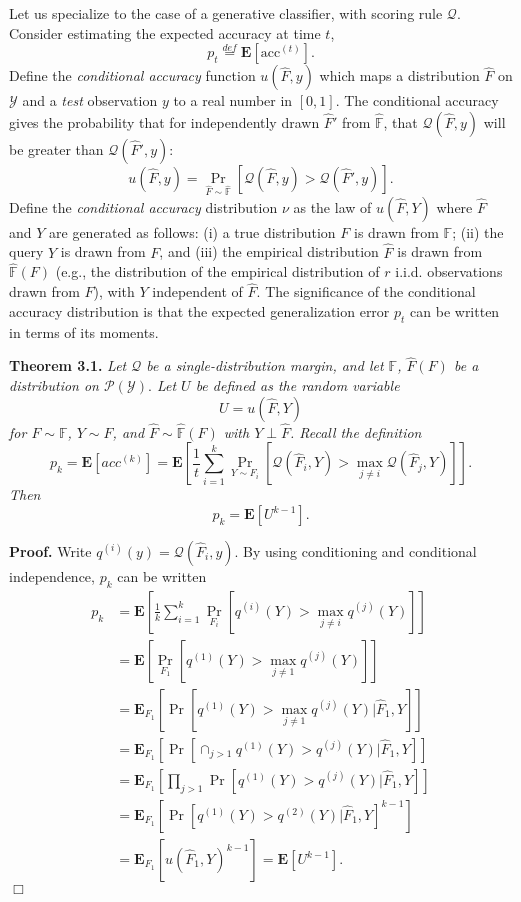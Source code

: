 \documentclass{article}
\newcommand{\E}{\textbf{E}}
\begin{document}
Let us specialize to the case of a generative classifier, with scoring rule $\mathcal{Q}$.
Consider estimating the expected accuracy at time $t$, \[p_t
\stackrel{def}{=} \E[\text{acc}^{(t)}].\]
Define the \emph{conditional accuracy} function $u(\hat{F}, y)$ which maps a
distribution $\hat{F}$ on $\mathcal{Y}$ and a \emph{test} observation $y$ to
a real number in $[0,1]$.  The conditional accuracy gives the
probability that for independently drawn $\hat{F}'$ from $\hat{\mathbb{F}}$, that
$\mathcal{Q}(\hat{F}, y)$ will be greater than $\mathcal{Q}(\hat{F}', y)$:
\[
u(\hat{F}, y) = \Pr_{\hat{F} \sim \hat{\mathbb{F}}}[\mathcal{Q}(\hat{F}, y) > \mathcal{Q}(\hat{F}', y)].
\]
Define the \emph{conditional accuracy} distribution $\nu$ as the law
of $u(\hat{F}, Y)$ where $\hat{F}$ and $Y$ are generated as follows:
(i) a true distribution $F$ is drawn from $\mathbb{F}$; (ii) the query $Y$ is drawn from $F$, 
and (iii) the empirical distribution $\hat{F}$ is drawn from $\hat{\mathbb{F}}(F)$ 
(e.g., the distribution of the empirical distribution of $r$ i.i.d. observations drawn from $F$),
with $Y$ independent of $\hat{F}$.  The significance of the conditional accuracy
distribution is that the expected generalization error $p_t$ can be
written in terms of its moments.

\noindent\textbf{Theorem 3.1.} \emph{
Let $\mathcal{Q}$ be a single-distribution margin, and let $\mathbb{F}$, $\hat{F}(F)$ be a distribution on $\mathcal{P}(\mathcal{Y}).$
Let $U$ be defined as the random variable
\[
U = u(\hat{F}, Y)
\]
for $F \sim \mathbb{F}$, $Y \sim F$, and $\hat{F} \sim \hat{\mathbb{F}}(F)$ with $Y \perp \hat{F}$.
Recall the definition
\[
p_k = \E[acc^{(k)}] = \E\left[\frac{1}{t}\sum_{i=1}^k \Pr_{Y \sim F_i}[\mathcal{Q}(\hat{F}_i, Y) > \max_{j \neq i}\mathcal{Q}(\hat{F}_j, Y)]\right].
\]
Then \[p_k = \E[U^{k-1}].\]
}

\noindent\textbf{Proof.}  
Write $q^{(i)}(y) = \mathcal{Q}(\hat{F}_i, y)$.
By using conditioning and
conditional independence, $p_k$ can be written
\begin{align*}
p_k &= \E\left[ \frac{1}{k}\sum_{i=1}^k  \Pr_{F_i}[q^{(i)}(Y) > \max_{j\neq i} q^{(j)}(Y)] \right]
\\&= \E\left[ \Pr_{F_1}[q^{(1)}(Y) > \max_{j\neq 1} q^{(j)}(Y)] \right]
\\&= \E_{F_1}[\Pr[q^{(1)}(Y) > \max_{j\neq 1} q^{(j)}(Y)|\hat{F}_1, Y]]
\\&= \E_{F_1}[\Pr[\cap_{j > 1} q^{(1)}(Y) > q^{(j)}(Y)|\hat{F}_1, Y]]
\\&= \E_{F_1}[\prod_{j > 1}\Pr[q^{(1)}(Y) > q^{(j)}(Y)|\hat{F}_1, Y]]
\\&= \E_{F_1}[\Pr[q^{(1)}(Y) > q^{(2)}(Y)|\hat{F}_1, Y]^{k-1}]
\\&= \E_{F_1}[u(\hat{F}_1, Y)^{k-1}] = \E[U^{k-1}].
\end{align*}
$\Box$
\end{document}

